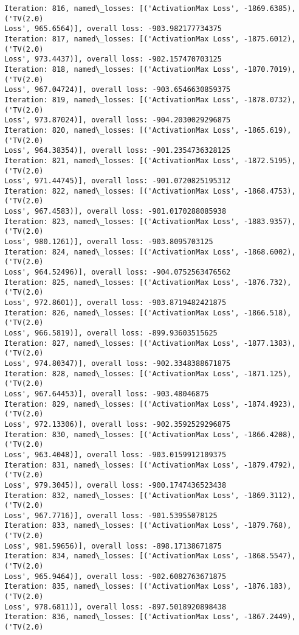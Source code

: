 \documentclass[10pt]{article}
\begin{document}
\begin{Verbatim}[commandchars=\\\{\}]
Iteration: 816, named\_losses: [('ActivationMax Loss', -1869.6385), ('TV(2.0)
Loss', 965.6564)], overall loss: -903.982177734375
Iteration: 817, named\_losses: [('ActivationMax Loss', -1875.6012), ('TV(2.0)
Loss', 973.4437)], overall loss: -902.157470703125
Iteration: 818, named\_losses: [('ActivationMax Loss', -1870.7019), ('TV(2.0)
Loss', 967.04724)], overall loss: -903.6546630859375
Iteration: 819, named\_losses: [('ActivationMax Loss', -1878.0732), ('TV(2.0)
Loss', 973.87024)], overall loss: -904.2030029296875
Iteration: 820, named\_losses: [('ActivationMax Loss', -1865.619), ('TV(2.0)
Loss', 964.38354)], overall loss: -901.2354736328125
Iteration: 821, named\_losses: [('ActivationMax Loss', -1872.5195), ('TV(2.0)
Loss', 971.44745)], overall loss: -901.0720825195312
Iteration: 822, named\_losses: [('ActivationMax Loss', -1868.4753), ('TV(2.0)
Loss', 967.4583)], overall loss: -901.0170288085938
Iteration: 823, named\_losses: [('ActivationMax Loss', -1883.9357), ('TV(2.0)
Loss', 980.1261)], overall loss: -903.8095703125
Iteration: 824, named\_losses: [('ActivationMax Loss', -1868.6002), ('TV(2.0)
Loss', 964.52496)], overall loss: -904.0752563476562
Iteration: 825, named\_losses: [('ActivationMax Loss', -1876.732), ('TV(2.0)
Loss', 972.8601)], overall loss: -903.8719482421875
Iteration: 826, named\_losses: [('ActivationMax Loss', -1866.518), ('TV(2.0)
Loss', 966.5819)], overall loss: -899.93603515625
Iteration: 827, named\_losses: [('ActivationMax Loss', -1877.1383), ('TV(2.0)
Loss', 974.80347)], overall loss: -902.3348388671875
Iteration: 828, named\_losses: [('ActivationMax Loss', -1871.125), ('TV(2.0)
Loss', 967.64453)], overall loss: -903.48046875
Iteration: 829, named\_losses: [('ActivationMax Loss', -1874.4923), ('TV(2.0)
Loss', 972.13306)], overall loss: -902.3592529296875
Iteration: 830, named\_losses: [('ActivationMax Loss', -1866.4208), ('TV(2.0)
Loss', 963.4048)], overall loss: -903.0159912109375
Iteration: 831, named\_losses: [('ActivationMax Loss', -1879.4792), ('TV(2.0)
Loss', 979.3045)], overall loss: -900.1747436523438
Iteration: 832, named\_losses: [('ActivationMax Loss', -1869.3112), ('TV(2.0)
Loss', 967.7716)], overall loss: -901.53955078125
Iteration: 833, named\_losses: [('ActivationMax Loss', -1879.768), ('TV(2.0)
Loss', 981.59656)], overall loss: -898.17138671875
Iteration: 834, named\_losses: [('ActivationMax Loss', -1868.5547), ('TV(2.0)
Loss', 965.9464)], overall loss: -902.6082763671875
Iteration: 835, named\_losses: [('ActivationMax Loss', -1876.183), ('TV(2.0)
Loss', 978.6811)], overall loss: -897.5018920898438
Iteration: 836, named\_losses: [('ActivationMax Loss', -1867.2449), ('TV(2.0)

\end{Verbatim}
\end{document}
